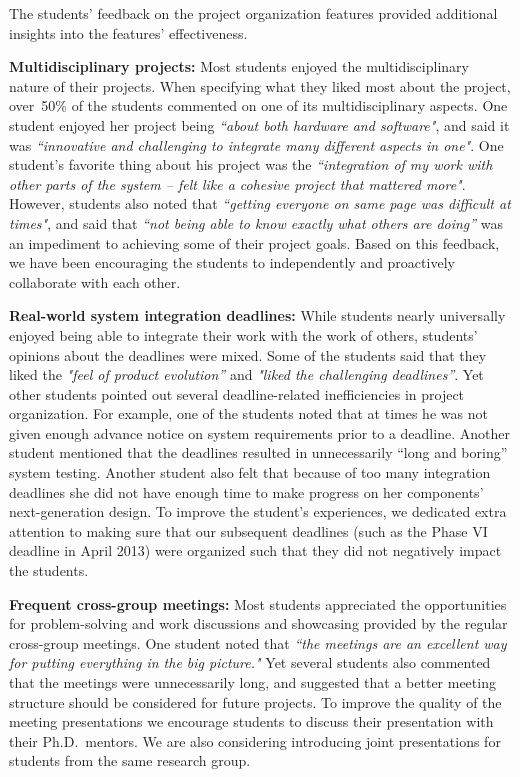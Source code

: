 \documentclass[journal,twopages]{IEEEtran}
\newcommand{\makered}[1]{\color{black}#1\color{black}}
\newenvironment{myitemize}{\begin{list}{}{\renewcommand{\leftmargin}{0.2in}}}{\end{list}}
\begin{document}
The students' feedback on the project organization features provided additional insights into the features' effectiveness.
\begin{myitemize}
\item  \textbf{Multidisciplinary projects:} Most students enjoyed the multidisciplinary nature of their projects. When specifying what they liked most about the project, over~50\% of the students commented on one of its multidisciplinary aspects. One student enjoyed her project being \emph{``about both hardware and software"}, and said it was \emph{``innovative and challenging to integrate many different aspects in one"}. One student's favorite thing about his project was the \emph{``integration of my work with other parts of the system -- felt like a cohesive project that mattered more"}. However, students also noted that \emph{``getting everyone on same page was difficult at times"}, and said that \emph{``not being able to know exactly what others are doing''} was an impediment to achieving some of their project goals. Based on this feedback, we have been encouraging the students to independently and proactively collaborate with each other.

\item  \textbf{Real-world system integration deadlines:}
    \makered{While students nearly universally enjoyed being able to integrate their work with the work of others, students' opinions about the deadlines were mixed.
    Some of the students said that they liked the \emph{"feel of product evolution''} and \emph{"liked the challenging deadlines''}. Yet other students pointed out several deadline-related inefficiencies in project organization. For example, one of the students noted that at times he was not given enough advance notice on system requirements prior to a deadline. Another student mentioned that the deadlines resulted in unnecessarily ``long and boring'' system testing. Another student also felt that because of too many integration deadlines she did not have enough time to make progress on her components' next-generation design.
    To improve the student's experiences, we dedicated extra attention to making sure that our subsequent deadlines (such as the Phase VI deadline in April 2013)
    were organized such that they did not negatively impact the students.} 

\item  \textbf{Frequent cross-group meetings:} Most students appreciated the opportunities for problem-solving and work discussions and showcasing provided by the regular cross-group meetings. One student noted that \emph{``the meetings are an excellent way for putting everything in the big picture."} Yet several students also commented that the meetings were unnecessarily long, and suggested that a better meeting structure should be considered for future projects. To improve the quality of the meeting presentations we encourage students to discuss their presentation with their Ph.D.\ mentors. We are also considering introducing joint presentations for students from the same research group.


\end{myitemize}
\end{document}
